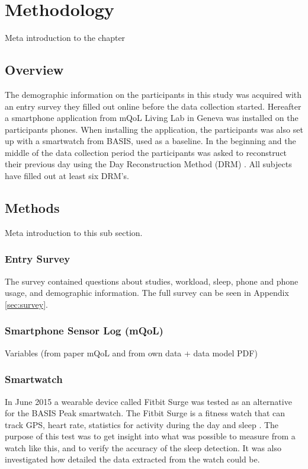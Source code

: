 \documentclass[12pt]{article} %
\begin{document}
\newpage
\section{Methodology}
Meta introduction to the chapter

\subsection{Overview}
The demographic information on the participants in this study was acquired with an entry survey they filled out online before the data collection started. Hereafter a smartphone application from mQoL Living Lab in Geneva \cite{mQOL} was installed on the participants phones. When installing the application, the participants was also set up with a smartwatch from BASIS, used as a baseline. In the beginning and the middle of the data collection period the participants was asked to reconstruct their previous day using the Day Reconstruction Method (DRM) \cite{drm}. All subjects have filled out at least six DRM's. 

\subsection{Methods}
Meta introduction to this sub section. 

\subsubsection{Entry Survey}
The survey contained questions about studies, workload, sleep, phone and phone usage, and demographic information. The full survey can be seen in Appendix \ref{sec:survey}. 

\subsubsection{Smartphone Sensor Log (mQoL)}
Variables (from paper mQoL and from own data + data model PDF)

\subsubsection{Smartwatch}
In June 2015 a wearable device called Fitbit Surge was tested as an alternative for the BASIS Peak smartwatch. The Fitbit Surge is a fitness watch that can track GPS, heart rate, statistics for activity during the day and sleep \cite{fitbit}. The purpose of this test was to get insight into what was possible to measure from a watch like this, and to verify the accuracy of the sleep detection. It was also investigated how detailed the data extracted from the watch could be.  \\
\end{document}
